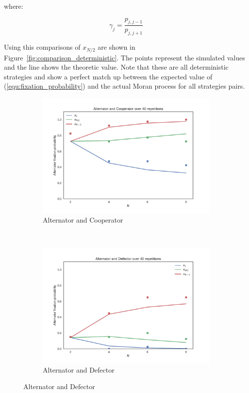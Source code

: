 \documentclass{article}
\begin{document}
where:

\[
\gamma_j = \frac{p_{j, j-1}}{p_{j, j+1}}
\]

Using this comparisons of \(x_{N/2}\) are shown in
Figure~\ref{fig:comparison_deterministic}. The points represent the simulated
values and the line shows the theoretic value. Note that these are all
deterministic strategies and show a perfect match up between the expected value
of (\ref{equ:fixation_probability}) and the actual Moran process for all
strategies pairs.

\begin{figure}[!hbtp]
    \centering
    \begin{subfigure}[t]{.3\textwidth}
        \centering
        \includegraphics[width=.8\textwidth]{../img/Alternator_v_Cooperator.pdf}
        \caption{Alternator and Cooperator}
    \end{subfigure}%
    ~
    \begin{subfigure}[t]{.3\textwidth}
        \centering
        \includegraphics[width=.8\textwidth]{../img/Alternator_v_Defector.pdf}
        \caption{Alternator and Defector}
    \end{subfigure}%

\end{figure}
\end{document}
